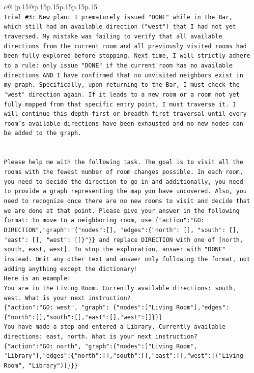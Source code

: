 \documentclass{article}
\begin{document}
{\begin{supertabular}{c@{$\;$}|p{.15\linewidth}@{}p{.15\linewidth}p{.15\linewidth}p{.15\linewidth}p{.15\linewidth}p{.15\linewidth}}
{{{\\ 
\texttt{Trial \#3: New plan: I prematurely issued "DONE" while in the Bar, which still had an available direction ("west") that I had not yet traversed. My mistake was failing to verify that all available directions from the current room and all previously visited rooms had been fully explored before stopping. Next time, I will strictly adhere to a rule: only issue "DONE" if the current room has no available directions AND I have confirmed that no unvisited neighbors exist in my graph. Specifically, upon returning to the Bar, I must check the "west" direction again. If it leads to a new room or a room not yet fully mapped from that specific entry point, I must traverse it. I will continue this depth{-}first or breadth{-}first traversal until every room's available directions have been exhausted and no new nodes can be added to the graph.} \\
\\ 
\\ 
\texttt{Please help me with the following task. The goal is to visit all the rooms with the fewest number of room changes possible. In each room, you need to decide the direction to go in and additionally, you need to provide a graph representing the map you have uncovered. Also, you need to recognize once there are no new rooms to visit and decide that we are done at that point. Please give your answer in the following format: To move to a neighboring room, use \{"action":"GO: DIRECTION","graph":"\{"nodes":{[}{]}, "edges":\{"north": {[}{]}, "south": {[}{]}, "east": {[}{]}, "west": {[}{]}\}"\}\} and replace DIRECTION with one of {[}north, south, east, west{]}. To stop the exploration, answer with "DONE" instead. Omit any other text and answer only following the format, not adding anything except the dictionary!} \\
\texttt{Here is an example: } \\
\texttt{You are in the Living Room. Currently available directions: south, west. What is your next instruction?} \\
\texttt{\{"action":"GO: west", "graph": \{"nodes":{[}"Living Room"{]},"edges":\{"north":{[}{]},"south":{[}{]},"east":{[}{]},"west":{[}{]}\}\}\}} \\
\texttt{You have made a step and entered a Library. Currently available directions: east, north. What is your next instruction?} \\
\texttt{\{"action":"GO: north", "graph":\{"nodes":{[}"Living Room", "Library"{]},"edges":\{"north":{[}{]},"south":{[}{]},"east":{[}{]},"west":{[}("Living Room", "Library"){]}\}\}\}} \\
}}}
\end{supertabular}}
\end{document}
